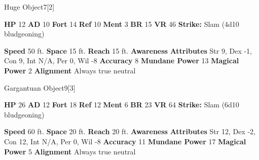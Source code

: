   

  \begin{monsubsection}{Huge Object}{7}[2]
    \vspace{-1em}\vspace{-1em}
    \vspace{0em}

    
    

    \begin{spellcontent}
      \begin{spelltargetinginfo}
        \pari \textbf{HP} 12 \monsep
          \textbf{AD} 10 \monsep
          \textbf{Fort} 14 \monsep
          \textbf{Ref} 10 \monsep
          \textbf{Ment} 3
        \pari \textbf{BR} 15 \monsep
        \textbf{VR} 46
        \pari \textbf{Strike:}
            Slam  (4d10 bludgeoning)
      \end{spelltargetinginfo}
    \end{spellcontent}
    \begin{monsterfooter}
      \pari \textbf{Speed} 50 ft. \monsep
        \textbf{Space} 15 ft. \monsep
        \textbf{Reach} 15 ft.
      \pari \textbf{Awareness} 
      \pari \textbf{Attributes}
        Str 9, Dex -1,
        Con 9, Int N/A,
        Per 0, Wil -8
      \pari \textbf{Accuracy} 8 \monsep
        \textbf{Mundane Power} 13 \monsep
      \textbf{Magical Power} 2
      \pari \textbf{Alignment} Always true neutral
    \end{monsterfooter}
  \end{monsubsection}
  
  

  \begin{monsubsection}{Gargantuan Object}{9}[3]
    \vspace{-1em}\vspace{-1em}
    \vspace{0em}

    
    

    \begin{spellcontent}
      \begin{spelltargetinginfo}
        \pari \textbf{HP} 26 \monsep
          \textbf{AD} 12 \monsep
          \textbf{Fort} 18 \monsep
          \textbf{Ref} 12 \monsep
          \textbf{Ment} 6
        \pari \textbf{BR} 23 \monsep
        \textbf{VR} 64
        \pari \textbf{Strike:}
            Slam  (6d10 bludgeoning)
      \end{spelltargetinginfo}
    \end{spellcontent}
    \begin{monsterfooter}
      \pari \textbf{Speed} 60 ft. \monsep
        \textbf{Space} 20 ft. \monsep
        \textbf{Reach} 20 ft.
      \pari \textbf{Awareness} 
      \pari \textbf{Attributes}
        Str 12, Dex -2,
        Con 12, Int N/A,
        Per 0, Wil -8
      \pari \textbf{Accuracy} 11 \monsep
        \textbf{Mundane Power} 17 \monsep
      \textbf{Magical Power} 5
      \pari \textbf{Alignment} Always true neutral
    \end{monsterfooter}
  \end{monsubsection}
  
